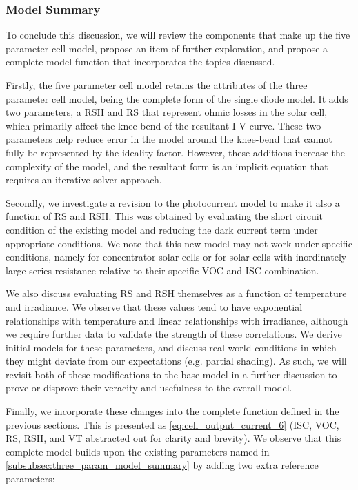 \subsubsection{Model Summary}\label{subsubsec:five_param_model_summary}

To conclude this discussion, we will review the components that make up the
five parameter cell model, propose an item of further exploration, and propose a
complete model function that incorporates the topics discussed.

Firstly, the five parameter cell model retains the attributes of the three
parameter cell model, being the complete form of the single diode model. It adds
two parameters, a \acf{RSH} and \acf{RS} that represent ohmic losses in the
solar cell, which primarily affect the knee-bend of the resultant \ac{I-V}
curve. These two parameters help reduce error in the model around the knee-bend
that cannot fully be represented by the ideality factor. However, these
additions increase the complexity of the model, and the resultant form is an
implicit equation that requires an iterative solver approach.

Secondly, we investigate a revision to the photocurrent model to make it also a
function of \ac{RS} and \ac{RSH}. This was obtained by evaluating the short
circuit condition of the existing model and reducing the dark current term under
appropriate conditions. We note that this new model may not work under specific
conditions, namely for concentrator solar cells or for solar cells with
inordinately large series resistance relative to their specific \ac{VOC} and
\ac{ISC} combination.

We also discuss evaluating \ac{RS} and \ac{RSH} themselves as a function of
temperature and irradiance. We observe that these values tend to have
exponential relationships with temperature and linear relationships with
irradiance, although we require further data to validate the strength of these
correlations. We derive initial models for these parameters, and discuss real
world conditions in which they might deviate from our expectations (e.g. partial
shading). As such, we will revisit both of these modifications to the base model
in a further discussion to prove or disprove their veracity and usefulness to
the overall model.

Finally, we incorporate these changes into the complete function defined in the
previous sections. This is presented as \autoref{eq:cell_output_current_6}
(\ac{ISC}, \ac{VOC}, \ac{RS}, \ac{RSH}, and \ac{VT} abstracted out for clarity
and brevity). We observe that this complete model builds upon the existing
parameters named in \autoref{subsubsec:three_param_model_summary} by adding two
extra reference parameters:

